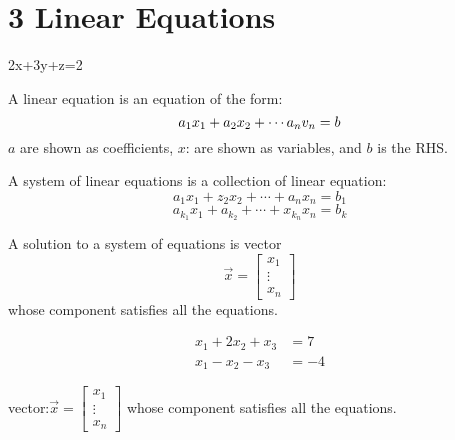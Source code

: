 \documentclass[11pt]{article}
\theoremstyle{plain}
\theoremstyle{remark}
\theoremstyle{plain}
\begin{document}
\section*{3 Linear Equations}
\begin{tcolorbox}[colback=magenta!5!white,colframe=magenta!75!black,title= Definition]
   2x+3y+z=2
\end{tcolorbox} 
\begin{tcolorbox}[colback=green!5!white,colframe=green!75!black,title= Definition]
   A linear equation is an equation of the form:
   \[a_1x_1+a_2x_2+\cdots\\a_nv_n=b\]
   $a$ are shown as coefficients, $x$: are shown as variables, and $b$ is the RHS.
\end{tcolorbox} 

\begin{tcolorbox}[colback=green!5!white,colframe=green!75!black,title= Definition]
   A system of linear equations is a collection of linear equation:
   \[a_1x_1+z_2x_2+\cdots+a_nx_n=b_1\]
   \[a_{k_1}x_1+a_{k_2}+\cdots + x_{k_n}x_n=b_k\]
\end{tcolorbox} 

\begin{tcolorbox}[colback=green!5!white,colframe=green!75!black,title= Definition]
    A solution to a system of equations is vector \[\overrightarrow{x}=\begin{bmatrix}
        x_1\\\vdots\\x_n
    \end{bmatrix}\]whose component satisfies all the equations.
 \end{tcolorbox} 

 \begin{tcolorbox}[colback=magenta!5!white,colframe=magenta!75!black,title= Example]
    \begin{align*}
        x_1+2x_2+x_3&=7\\
        x_1-x_2-x_3&=-4
    \end{align*}
    
    vector:$\overrightarrow{x}=\begin{bmatrix}
        x_1\\\vdots\\x_n
    \end{bmatrix}$ whose component satisfies all the equations.
 \end{tcolorbox} 
\end{document}
